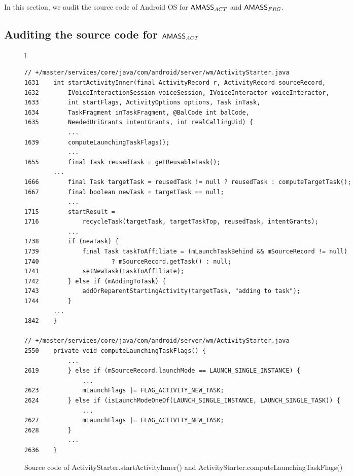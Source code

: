 
In this section, we audit the source code of Android OS for $\textsf{AMASS}_{ACT}$ and $\textsf{AMASS}_{FRG}$.

\subsection{Auditing the source code for $\textsf{AMASS}_{ACT}$}\label{app:code-audit-aomass}

\begin{figure}[htbp]
\centering
\begin{tabular*}{\linewidth}{l}
\begin{lstlisting}
// +/master/services/core/java/com/android/server/wm/ActivityStarter.java
1631    int startActivityInner(final ActivityRecord r, ActivityRecord sourceRecord,
1632        IVoiceInteractionSession voiceSession, IVoiceInteractor voiceInteractor,
1633        int startFlags, ActivityOptions options, Task inTask,
1634        TaskFragment inTaskFragment, @BalCode int balCode,
1635        NeededUriGrants intentGrants, int realCallingUid) {
            ...
1639        computeLaunchingTaskFlags();
            ...
1655	    final Task reusedTask = getReusableTask();
	    ...
1666        final Task targetTask = reusedTask != null ? reusedTask : computeTargetTask();
1667	    final boolean newTask = targetTask == null;
            ...
1715        startResult = 
1716            recycleTask(targetTask, targetTaskTop, reusedTask, intentGrants);
            ...
1738	    if (newTask) {
1739            final Task taskToAffiliate = (mLaunchTaskBehind && mSourceRecord != null)
1740                    ? mSourceRecord.getTask() : null;
1741            setNewTask(taskToAffiliate);
1742        } else if (mAddingToTask) {
1743            addOrReparentStartingActivity(targetTask, "adding to task");
1744        }
	    ...
1842    }

// +/master/services/core/java/com/android/server/wm/ActivityStarter.java
2550    private void computeLaunchingTaskFlags() {
            ...
2619        } else if (mSourceRecord.launchMode == LAUNCH_SINGLE_INSTANCE) {
                ...
2623            mLaunchFlags |= FLAG_ACTIVITY_NEW_TASK;
2624        } else if (isLaunchModeOneOf(LAUNCH_SINGLE_INSTANCE, LAUNCH_SINGLE_TASK)) {
                ...
2627            mLaunchFlags |= FLAG_ACTIVITY_NEW_TASK;
2628        }
            ...
2636    }
\end{lstlisting}
\end{tabular*}
\caption{Source code of ActivityStarter.startActivityInner() and ActivityStarter.computeLaunchingTaskFlags()}
\label{code-startActivityInner}
\end{figure}


